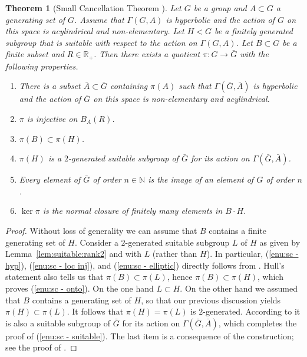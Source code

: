 \documentclass[11pt]{article}
\newtheorem{theorem}{Theorem}[section]
\theoremstyle{definition}
\begin{document}
\begin{theorem}[Small Cancellation Theorem {\cite[Th.\,7.1]{hull}}]
\label{thm:sc}
Let $G$ be a group and $A \subset G$ a generating set of $G$.
Assume that $\Gamma(G,A)$ is hyperbolic and the action of $G$ on this space is acylindrical and non-elementary.
Let $H < G$ be a finitely generated subgroup that is suitable with respect to the action on $\Gamma(G,A)$. Let $B \subset G$ be a finite subset and $R \in \mathbb R_+$. Then there exists a quotient $\pi \colon G \to \bar G$ with the following properties.
\begin{enumerate}
\item\label{enu:sc - hyp} There is a subset $\bar A \subset \bar G$ containing $\pi(A)$ such that $\Gamma(\bar G, \bar A)$ is hyperbolic and the action of $\bar G$ on this space is non-elementary and acylindrical.
\item \label{enu:sc - loc inj} $\pi$ is injective on $B_A(R)$.
\item \label{enu:sc - onto} $\pi(B) \subset \pi(H)$.
\item \label{enu:sc - suitable} $\pi(H)$ is a $2$-generated suitable subgroup of $\bar G$ for its action on $\Gamma(\bar G, \bar A)$.
\item \label{enu:sc - elliptic} Every element of $\bar G$ of order $n \in \mathbb{N}$ is the image of an element of $G$ of order $n$.
\item \label{enu:sc - fp} $\ker\pi$ is the normal closure of finitely many elements in $B \cdot H$.
\end{enumerate}
\end{theorem}

\begin{proof}
Without loss of generality we can assume that $B$ contains a finite generating set of $H$.
Consider a $2$-generated suitable subgroup $L$ of $H$ as given by Lemma~\ref{lem:suitable:rank2} and \cite[Th.\,7.1]{hull} with $L$ (rather than $H$).
In particular, (\ref{enu:sc - hyp}), (\ref{enu:sc - loc inj}), and (\ref{enu:sc - elliptic}) directly follows from \cite[Th.\,7.1]{hull}.
Hull's statement also tells us that $\pi(B) \subset \pi(L)$, hence $\pi(B) \subset \pi(H)$, which proves (\ref{enu:sc - onto}).
On the one hand $L \subset H$.
On the other hand we assumed that $B$ contains a generating set of $H$, so that our previous discussion yields $\pi(H) \subset \pi(L)$.
It follows that $\pi(H) = \pi(L)$ is $2$-generated.
According to \cite[Th.\,7.1]{hull} it is also a suitable subgroup of $\bar G$ for its action on $\Gamma(\bar G, \bar A)$, which completes the proof of (\ref{enu:sc - suitable}).
The last item is a consequence of the construction; see the proof of \cite[Th.\,7.1]{hull}.
\end{proof}
\end{document}
